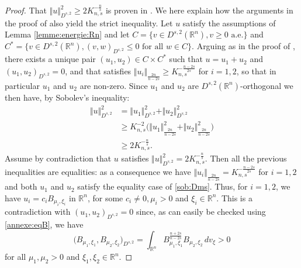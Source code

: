 \documentclass[10pt]{amsart}
\numberwithin{equation}{section}
\newcommand{\R}{\mathbb{R}}
\theoremstyle{plain}
\theoremstyle{remark}
\begin{document}
\begin{proof}
That $\Vert u \Vert_{D^{s,2}}^2 \ge 2 K_{n,s}^{-\frac{n}{s}}$ is proven in \cite[Lemma 7.22]{GazzolaGrunauSweers}. We here explain how the arguments in the proof of \cite[Lemma 7.22]{GazzolaGrunauSweers} also yield the strict inequality. Let $u$ satisfy the assumptions of Lemma \ref{lemme:energie:Rn} and let $C = \{ v \in D^{s,2}(\R^n), v \ge 0 \text{ a.e.} \}$ and $C^* = \{ v \in D^{s,2}(\R^n), (v,w)_{D^{s,2}}\le 0 \text{ for all } w \in C \}$. Arguing as in the proof of  \cite[Lemma 7.22]{GazzolaGrunauSweers}, there exists a unique pair $(u_1, u_2) \in C \times C^*$ such that $u=u_1+u_2$ and $(u_1,u_2)_{D^{s,2}} = 0$, and that satisfies $\Vert u_i \Vert_{\frac{2n}{n-2s}} \ge K_{n,s}^{-\frac{n-2s}{2s}}$ for $i=1,2$, so that in particular $u_1$ and $u_2$ are non-zero. Since $u_1$ and $u_2$ are $D^{s,2}(\R^n)$-orthogonal we then have, by Sobolev's inequality:
$$ \begin{aligned}
 \Vert u \Vert_{D^{s,2}}^2   & = \Vert u_1 \Vert_{D^{s,2}}^2 + \Vert u_2 \Vert_{D^{s,2}}^2  \\
& \ge K_{n,s}^{-2} \big( \Vert u_1 \Vert_{\frac{2n}{n-2s}} ^2 + \Vert u_2 \Vert_{\frac{2n}{n-2s}} ^2 \big)  \\
& \ge 2 K_{n,s}^{-\frac{n}{s}}.
\end{aligned} $$
Assume by contradiction that $u$ satisfies $ \Vert u \Vert_{D^{s,2}}^2 = 2 K_{n,s}^{-\frac{n}{s}}$. Then all the previous inequalities are equalities: as a consequence we have $\Vert u_i \Vert_{\frac{2n}{n-2s}} = K_{n,s}^{-\frac{n-2s}{2s}}$ for $i=1,2$ and both $u_1$  and $u_2$ satisfy the equality case of \eqref{sob:Dms}. Thus, for $i=1,2$, we have $ u_i = c_i B_{\mu_i, \xi_i}$ in $\R^n$, for some $c_i \neq 0, \mu_i >0$ and $\xi_i \in \R^n$. This is a contradiction with $(u_1,u_2)_{D^{s,2}} = 0$ since, as can easily be checked using \eqref{annexe:eqB}, we have 
$$ \big ( B_{\mu_1, \xi_1}, B_{\mu_2, \xi_2}\big)_{D^{s,2}} = \int_{\R^n} B_{\mu_1, \xi_1}^{\frac{n+2s}{n-2s}} B_{\mu_2, \xi_2}\, dv_ \xi >0   $$
for all $\mu_1, \mu_2>0$  and $\xi_1, \xi_2 \in \R^n$.
\end{proof}






\end{document}
